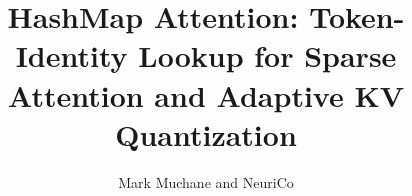 \documentclass{article}
\title{HashMap Attention: Token-Identity Lookup for Sparse Attention and Adaptive KV Quantization}
\author{Mark Muchane and NeuriCo}
\begin{document}
\maketitle

\begin{abstract}

\end{abstract}









\end{document}
